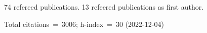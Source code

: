 74 refereed publications. 13 refeered publications as first author.

Total citations~=~3006; h-index~=~30 (2022-12-04)